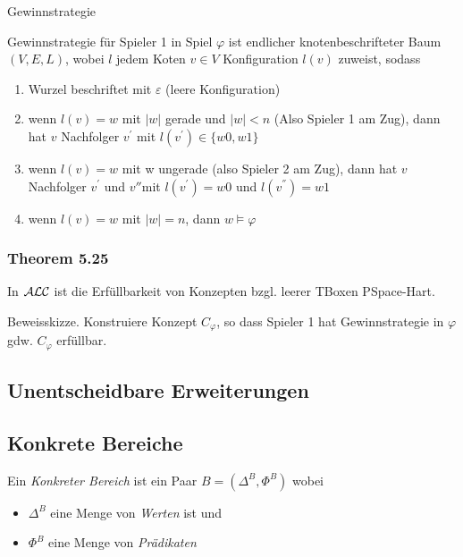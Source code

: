 \begin{definition}{Gewinnstrategie}

Gewinnstrategie für Spieler 1 in Spiel $\varphi$ ist endlicher
knotenbeschrifteter Baum $(V,E,L)$, wobei $l$ jedem Koten
$v \in V$ Konfiguration $l(v)$ zuweist, sodass
\end{definition}

\begin{enumerate}
\def\labelenumi{\alph{enumi})}
\item
  Wurzel beschriftet mit $\varepsilon$ (leere Konfiguration)
\item
  wenn $l\left( v \right) = w$ mit $\left| w \right|$ gerade und
  $\left| w \right| < n$ (Also Spieler 1 am Zug), dann hat $v$
  Nachfolger $v^{'}$ mit $l\left( v^{'} \right) \in \{ w0,w1\}$
\item
  wenn $l\left( v \right) = w$ mit \textbar{}w\textbar{} ungerade
  (also Spieler 2 am Zug), dann hat $v$ Nachfolger $v^{'}$ und
  $v''$mit $l\left( v^{'} \right) = w0$ und
  $l\left( v^{''} \right) = w1$
\item
  wenn $l\left( v \right) = w$ mit $\left| w \right| = n$, dann
  $w \vDash \varphi$
\end{enumerate}

\subsubsection{Theorem 5.25}\label{theorem-5.25}

In $\mathcal{A}\mathcal{L}\mathcal{C}$ ist die Erfüllbarkeit von Konzepten bzgl. leerer TBoxen
PSpace-Hart.

Beweisskizze. Konstruiere Konzept $C_{\varphi}$, so dass Spieler 1 hat
Gewinnstrategie in $\varphi$ gdw. $C_{\varphi}$ erfüllbar.

\subsection{Unentscheidbare
Erweiterungen}\label{unentscheidbare-erweiterungen}

\subsection{Konkrete Bereiche}\label{konkrete-bereiche}

Ein \emph{Konkreter Bereich} ist ein Paar $B = (\Delta^{B},\Phi^{B})$
wobei

\begin{itemize}
\item
  $\Delta^{B}$ eine Menge von \emph{Werten} ist und
\item
  $\Phi^{B}$ eine Menge von \emph{Prädikaten}
\end{itemize}

